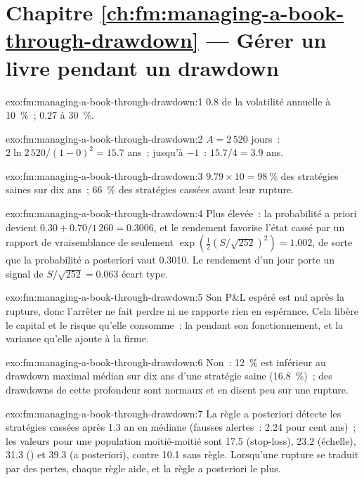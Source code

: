 \section*{Chapitre \ref{ch:fm:managing-a-book-through-drawdown} --- Gérer un livre pendant un drawdown}

\begin{solution}{exo:fm:managing-a-book-through-drawdown:1}
0.8 de la volatilité annuelle à 10~\%~; 0.27 à 30~\%.
\end{solution}

\begin{solution}{exo:fm:managing-a-book-through-drawdown:2}
$A=2\,520$ jours~: $2\ln2\,520/(1-0)^2=15.7$ ans~; jusqu'à $-1$~: $15.7/4=3.9$ ans.
\end{solution}

\begin{solution}{exo:fm:managing-a-book-through-drawdown:3}
$9.79\times10=98~\%$ des stratégies saines sur dix ans~; 66~\% des stratégies cassées avant leur rupture.
\end{solution}

\begin{solution}{exo:fm:managing-a-book-through-drawdown:4}
Plus élevée~: la probabilité a priori devient $0.30+0.70/1\,260=0.3006$, et le rendement favorise l'état cassé par un rapport de vraisemblance de
seulement $\exp(\tfrac12(S/\sqrt{252})^2)=1.002$, de sorte que la probabilité a posteriori vaut 0.3010. Le rendement d'un jour porte un signal de $S/\sqrt{252}=0.063$ écart type.
\end{solution}

\begin{solution}{exo:fm:managing-a-book-through-drawdown:5}
Son P\&L espéré est nul après la rupture, donc l'arrêter ne fait perdre ni ne rapporte rien en espérance. Cela libère le capital et le risque qu'elle
consomme~: la  pendant son fonctionnement, et la variance qu'elle ajoute à la firme.
\end{solution}

\begin{solution}{exo:fm:managing-a-book-through-drawdown:6}
Non~: 12~\% est inférieur au drawdown maximal médian sur dix ans d'une stratégie saine (16.8~\%)~; des drawdowns de cette profondeur sont normaux et
en disent peu sur une rupture.
\end{solution}

\begin{solution}{exo:fm:managing-a-book-through-drawdown:7}
La règle a posteriori détecte les stratégies cassées après 1.3 an en médiane (fausses alertes~: 2.24 pour cent ans)~; les valeurs pour une population
moitié-moitié sont 17.5 (stop-loss), 23.2 (échelle), 31.3 () et 39.3 (a posteriori), contre 10.1 sans règle. Lorsqu'une rupture se traduit par
des pertes, chaque règle aide, et la règle a posteriori le plus.
\end{solution}

